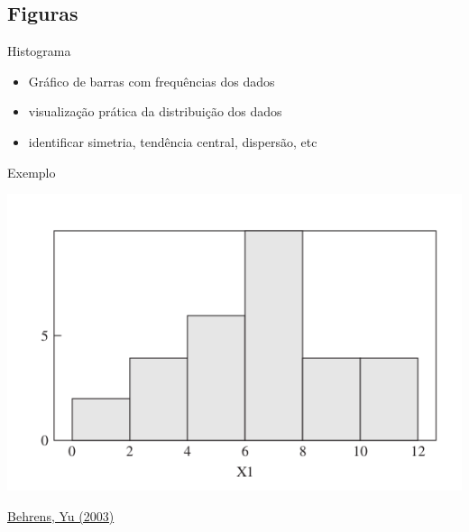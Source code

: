 \documentclass{beamer}
\begin{document}


\subsection{Figuras}


\begin{frame}{Histograma}
  \begin{itemize}
    \footnotesize
  \item Gráfico de barras com frequências dos dados
    \bigskip
  \item visualização prática da distribuição dos dados
    \bigskip
  \item identificar simetria, tendência central, dispersão, etc
  \end{itemize}
\end{frame}

\begin{frame}
  \begin{exampleblock}{Exemplo}
    \begin{center}
      \includegraphics[height=0.7\textheight]{EDA/eda-histograma1}
    \end{center}
  \end{exampleblock}

  \vfill
  \scriptsize
  \hfill \href{https://doi.org/10.1002/0471264385.wei0202}
  {Behrens, Yu (2003)}
\end{frame}
\end{document}
